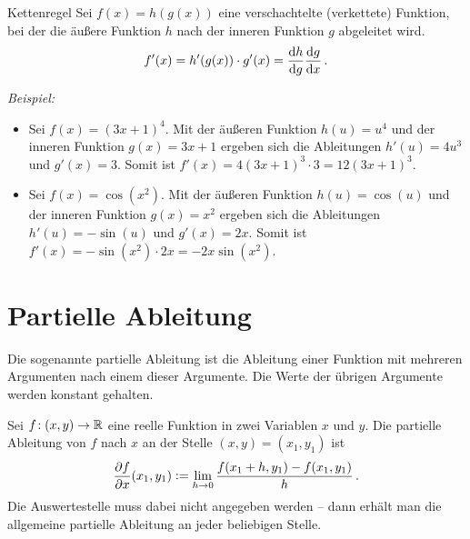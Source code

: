 \begin{rememberbox}{Kettenregel}
Sei $f(x) = h(g(x))$ eine verschachtelte (verkettete) Funktion, bei der die äußere Funktion $h$ nach der inneren Funktion $g$ abgeleitet wird.
\begin{equation}
    f'(x) = h'(g(x)) \cdot g'(x) = \frac{\mathrm{d} h}{\mathrm{d} g}\frac{\mathrm{d} g}{\mathrm{d} x}\,.
\end{equation}
\end{rememberbox}
\textit{Beispiel:}
\begin{itemize}
    \item Sei $f(x) = (3x+1)^4$. Mit der äußeren Funktion $h(u) = u^4$ und der inneren Funktion $g(x) = 3x+1$ ergeben sich die Ableitungen $h'(u) = 4u^3$ und $g'(x) = 3$.\newline
    Somit ist $f'(x) = 4(3x+1)^3 \cdot 3 = 12(3x+1)^3$.
    \item Sei $f(x) = \cos(x^2)$. Mit der äußeren Funktion $h(u) = \cos(u)$ und der inneren Funktion $g(x) = x^2$ ergeben sich die Ableitungen $h'(u) = -\sin(u)$ und $g'(x) = 2x$.\newline
    Somit ist $f'(x) = -\sin(x^2) \cdot 2x = -2x\sin(x^2)$.
\end{itemize}

\section{Partielle Ableitung}\label{sec: Partielle_Ableitung}
Die sogenannte partielle Ableitung ist die Ableitung einer Funktion mit mehreren Argumenten nach einem dieser Argumente. Die Werte der übrigen Argumente werden konstant gehalten.

Sei $f\!: (x,y) \to \mathbb{R}$ eine reelle Funktion in zwei Variablen $x$ und $y$. Die partielle Ableitung von $f$ nach $x$ an der Stelle $(x,y) = (x_1,y_1)$ ist
\begin{equation}
    \frac{\partial f}{\partial x}(x_1, y_1) \vcentcolon= \lim_{h \rightarrow 0} \frac{f(x_1+ h,y_1)-f(x_1,y_1)}{h} \,.
\end{equation}
Die Auswertestelle muss dabei nicht angegeben werden -- dann erhält man die allgemeine partielle Ableitung an jeder beliebigen Stelle. \\

